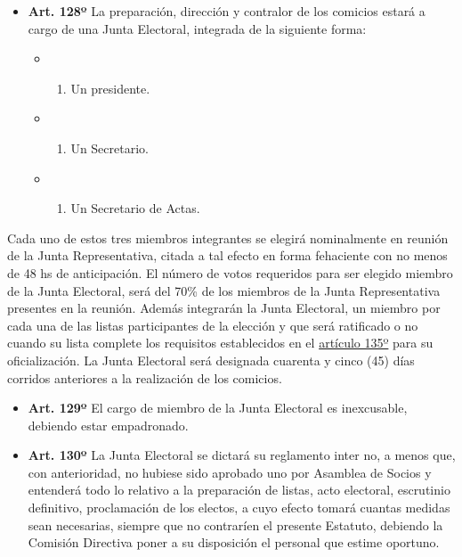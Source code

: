 \documentclass[]{book}
\providecommand{\tightlist}{%
  \setlength{\itemsep}{0pt}\setlength{\parskip}{0pt}}
\begin{document}
\begin{itemize}
\tightlist
\item
  \textbf{Art. 128º} La preparación, dirección y contralor de los
  comicios estará a cargo de una Junta Electoral, integrada de la
  siguiente forma:

  \begin{itemize}
  \item
    \begin{enumerate}
    \def\labelenumi{\alph{enumi})}
    \tightlist
    \item
      Un presidente.
    \end{enumerate}
  \item
    \begin{enumerate}
    \def\labelenumi{\alph{enumi})}
    \setcounter{enumi}{1}
    \tightlist
    \item
      Un Secretario.
    \end{enumerate}
  \item
    \begin{enumerate}
    \def\labelenumi{\alph{enumi})}
    \setcounter{enumi}{2}
    \tightlist
    \item
      Un Secretario de Actas.
    \end{enumerate}
  \end{itemize}
\end{itemize}

Cada uno de estos tres miembros integrantes se elegirá nominalmente en
reunión de la Junta Representativa, citada a tal efecto en forma
fehaciente con no menos de 48 hs de anticipación. El número de votos
requeridos para ser elegido miembro de la Junta Electoral, será del 70\%
de los miembros de la Junta Representativa presentes en la reunión.
Además integrarán la Junta Electoral, un miembro por cada una de las
listas participantes de la elección y que será ratificado o no cuando su
lista complete los requisitos establecidos en el
\protect\hyperlink{art135}{artículo 135º} para su oficialización. La
Junta Electoral será designada cuarenta y cinco (45) días corridos
anteriores a la realización de los comicios.

\begin{itemize}
\item
  \textbf{Art. 129º} El cargo de miembro de la Junta Electoral es
  inexcusable, debiendo estar empadronado.
\item
  \textbf{Art. 130º} La Junta Electoral se dictará su reglamento inter
  no, a menos que, con anterioridad, no hubiese sido aprobado uno por
  Asamblea de Socios y entenderá todo lo relativo a la preparación de
  listas, acto electoral, escrutinio definitivo, proclamación de los
  electos, a cuyo efecto tomará cuantas medidas sean necesarias, siempre
  que no contraríen el presente Estatuto, debiendo la Comisión Directiva
  poner a su disposición el personal que estime oportuno.
\end{itemize}
\end{document}
